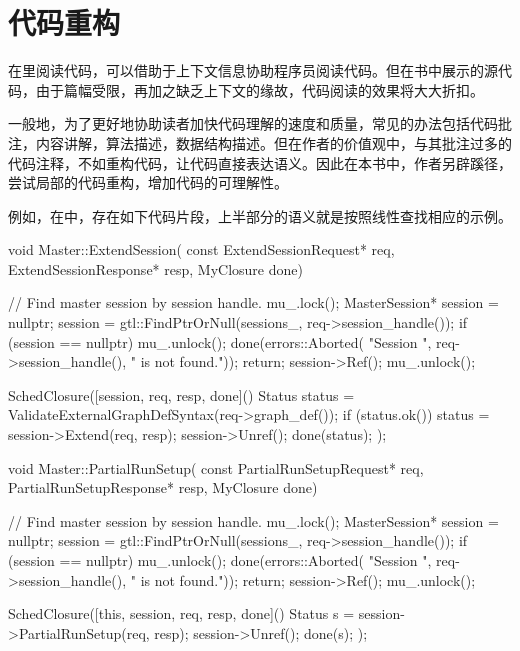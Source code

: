 \section*{代码重构}

\begin{content}

在里阅读代码，可以借助于上下文信息协助程序员阅读代码。但在书中展示的源代码，由于篇幅受限，再加之缺乏上下文的缘故，代码阅读的效果将大大折扣。

一般地，为了更好地协助读者加快代码理解的速度和质量，常见的办法包括代码批注，内容讲解，算法描述，数据结构描述。但在作者的价值观中，与其批注过多的代码注释，不如重构代码，让代码直接表达语义。因此在本书中，作者另辟蹊径，尝试局部的代码重构，增加代码的可理解性。

例如，在中，存在如下代码片段，上半部分的语义就是按照线性查找相应的示例。

\begin{leftbar}
\begin{c++}
void Master::ExtendSession(
    const ExtendSessionRequest* req,
    ExtendSessionResponse* resp, MyClosure done) {
  // Find master session by session handle.
  mu_.lock();
  MasterSession* session = nullptr;
  session = gtl::FindPtrOrNull(sessions_, req->session_handle());
  if (session == nullptr) {
    mu_.unlock();
    done(errors::Aborted(
         "Session ", req->session_handle(), " is not found."));
    return;
  }
  session->Ref();
  mu_.unlock();

  SchedClosure([session, req, resp, done]() {
    Status status = ValidateExternalGraphDefSyntax(req->graph_def());
    if (status.ok()) {
      status = session->Extend(req, resp);
    }
    session->Unref();
    done(status);
  });
}

void Master::PartialRunSetup(
    const PartialRunSetupRequest* req,
    PartialRunSetupResponse* resp, MyClosure done) {
  // Find master session by session handle.
  mu_.lock();
  MasterSession* session = nullptr;
  session = gtl::FindPtrOrNull(sessions_, req->session_handle());
  if (session == nullptr) {
    mu_.unlock();
    done(errors::Aborted(
         "Session ", req->session_handle(), " is not found."));
    return;
  }
  session->Ref();
  mu_.unlock();

  SchedClosure([this, session, req, resp, done]() {
    Status s = session->PartialRunSetup(req, resp);
    session->Unref();
    done(s);
  });
}
\end{c++}
\end{leftbar}


\end{content}
